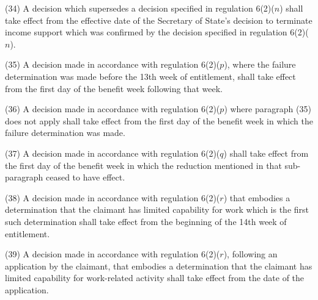 \documentclass[12pt,a4paper]{article}
\begin{document}
(34) A decision which supersedes a decision specified in regulation 6(2)($n$)  shall take effect from the effective date of the Secretary of State’s decision to terminate income support which was confirmed by the decision specified in regulation 6(2)($n$).

(35) A decision made in accordance with regulation 6(2)($p$), where the failure determination was made before the 13th week of entitlement, shall take effect from the first day of the benefit week following that week.

(36) A decision made in accordance with regulation 6(2)($p$)  where paragraph (35) does not apply shall take effect from the first day of the benefit week in which the failure determination was made.

(37) A decision made in accordance with regulation 6(2)($q$)  shall take effect from the first day of the benefit week in which the reduction mentioned in that sub-paragraph ceased to have effect.

(38) A decision made in accordance with regulation 6(2)($r$)  that embodies a determination that the claimant has limited capability for work which is the first such determination shall take effect from the beginning of the 14th week of entitlement.

(39) A decision made in accordance with regulation 6(2)($r$), following an application by the claimant, that embodies a determination that the claimant has limited capability for work-related activity shall take effect from the date of the application.
\end{document}
